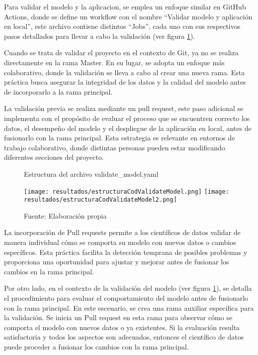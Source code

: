 Para validar el modelo y la aplicacion, se emplea un enfoque similar en GitHub Actions, donde se define un workflow con el nombre ``Validar modelo y aplicación en local'', este archivo contiene distintos ``Jobs'', cada uno con sus respectivos pasos detallados para llevar a cabo la validación (ver figura \ref{fig:figuraEstructuraCodValidateModel}). \newline

Cuando se trata de validar el proyecto en el contexto de Git, ya no se realiza directamente en la rama Master. En su lugar, se adopta un enfoque más colaborativo, donde la validación se lleva a cabo al crear una nueva rama. Esta práctica busca asegurar la integridad de los datos y la calidad del modelo antes de incorporarlo a la rama principal. \newline

La validación previa se realiza mediante un pull request, este paso adicional se implementa con el propósito de evaluar el proceso que se encuentren correcto los datos, el desempeño del modelo y el despliegue de la aplicación en local, antes de fusionarlo con la rama principal. Esta estrategia es relevante en entornos de trabajo colaborativo, donde distintas personas pueden estar modificando diferentes secciones del proyecto.

\newpage

\begin{figure}[h]
	\centering
	\caption{Estructura del archivo validate\_model.yaml}
	\texttt{[image: resultados/estructuraCodValidateModel.png]}
	\texttt{[image: resultados/estructuraCodValidateModel2.png]}
	\caption*{\footnotesize Fuente: Elaboración propia}
	\label{fig:figuraEstructuraCodValidateModel}
\end{figure}

\newpage

La incorporación de Pull requests permite a los científicos de datos validar de manera individual cómo se comporta su modelo con nuevos datos o cambios específicos. Esta práctica facilita la detección temprana de posibles problemas y proporciona una oportunidad para ajustar y mejorar antes de fusionar los cambios en la rama principal. \newline

Por otro lado, en el contexto de la validación del modelo (ver figura \ref{fig:figuraEstructuraCodValidateModel}), se detalla el procedimiento para evaluar el comportamiento del modelo antes de fusionarlo con la rama principal. En este escenario, se crea una rama auxiliar específica para la validación. Se inicia un Pull request en esta rama para observar cómo se comporta el modelo con nuevos datos o ya existentes. Si la evaluación resulta satisfactoria y todos los aspectos son adecuados, entonces el científico de datos puede proceder a fusionar los cambios con la rama principal. \newline

